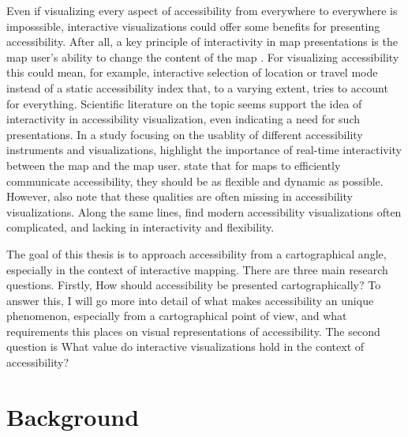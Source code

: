 \documentclass[12pt]{article}
\begin{document}
Even if visualizing every aspect of accessibility from everywhere to everywhere is imposssible,
interactive visualizations could offer some benefits for presenting accessibility.
After all, a key principle of interactivity in map presentations is
the map user's ability to change the content of the map \parencite{rot2013}.
For visualizing accessibility this could mean, for example,
interactive selection of location or travel mode instead of
a static accessibility index that, to a varying extent, tries to account for everything.
Scientific literature on the topic seems support the idea of
interactivity in accessibility visualization, even indicating a need for such presentations.
In a study focusing on the usablity of different accessibility instruments and visualizations,  %
\textcite{te2014} highlight the importance of real-time interactivity between the map and the map user.
\textcite{but2018} state that for maps to efficiently communicate accessibility,
they should be as flexible and dynamic as possible.
However, \citeauthor{but2018} also note that these qualities are often missing in accessibility visualizations.
Along the same lines, \textcite{paj2021} find modern accessibility visualizations often complicated,
and lacking in interactivity and flexibility.


The goal of this thesis is to approach accessibility from a cartographical angle,
especially in the context of interactive mapping.
There are three main research questions.
Firstly, How should accessibility be presented cartographically?
To answer this, I will go more into detail of what makes accessibility an unique phenomenon,
especially from a cartographical point of view,
and what requirements this places on visual representations of accessibility.
The second question is
What value do interactive visualizations hold in the context of accessibility?


\section{Background}

\subsection{}
\end{document}
